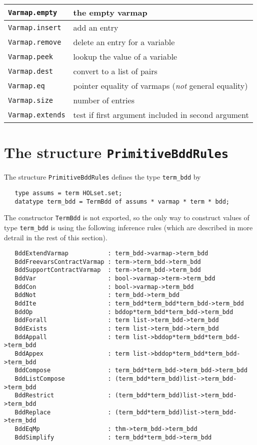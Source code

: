 \documentclass[12pt]{article}
\renewcommand{\t}[1]{\mbox{\tt #1}}
\newcommand{\ml}[1]{{\tt #1}}
\newcommand\termbddty{\texttt{term\_bdd}\xspace}
\begin{document}
\begin{tabular}{|l|l|} \hline
\t{Varmap.empty} &    the empty varmap \\ \hline
\t{Varmap.insert} &   add an entry \\ \hline
\t{Varmap.remove} &   delete an entry for a variable \\ \hline
\t{Varmap.peek} &     lookup the value of a variable \\ \hline
\t{Varmap.dest} &     convert to a list of pairs \\ \hline
\t{Varmap.eq} &       pointer equality of varmaps ({\it not} general equality) \\ \hline
\t{Varmap.size} &     number of entries \\ \hline
\t{Varmap.extends} &  test if first argument included in second argument\\ \hline
\end{tabular}

\section{The structure \t{PrimitiveBddRules}}\label{PrimitiveBddRules}


The structure \ml{PrimitiveBddRules} defines the type \termbddty{} by

\vspace*{-2mm}

\begin{verbatim}
   type assums = term HOLset.set;
   datatype term_bdd = TermBdd of assums * varmap * term * bdd;
\end{verbatim}

\vspace*{-2mm}

The constructor \t{TermBdd} is not exported, so the only way to construct
values of type \termbddty is using the following inference rules
(which are described in more detrail in the rest of this section).

{\footnotesize\begin{verbatim}
   BddExtendVarmap           : term_bdd->varmap->term_bdd
   BddFreevarsContractVarmap : term->term_bdd->term_bdd
   BddSupportContractVarmap  : term->term_bdd->term_bdd
   BddVar                    : bool->varmap->term->term_bdd
   BddCon                    : bool->varmap->term_bdd
   BddNot                    : term_bdd->term_bdd
   BddIte                    : term_bdd*term_bdd*term_bdd->term_bdd
   BddOp                     : bddop*term_bdd*term_bdd->term_bdd
   BddForall                 : term list->term_bdd->term_bdd
   BddExists                 : term list->term_bdd->term_bdd
   BddAppall                 : term list->bddop*term_bdd*term_bdd->term_bdd
   BddAppex                  : term list->bddop*term_bdd*term_bdd->term_bdd
   BddCompose                : term_bdd*term_bdd->term_bdd->term_bdd
   BddListCompose            : (term_bdd*term_bdd)list->term_bdd->term_bdd
   BddRestrict               : (term_bdd*term_bdd)list->term_bdd->term_bdd
   BddReplace                : (term_bdd*term_bdd)list->term_bdd->term_bdd
   BddEqMp                   : thm->term_bdd->term_bdd
   BddSimplify               : term_bdd*term_bdd->term_bdd
\end{verbatim}}
\end{document}
